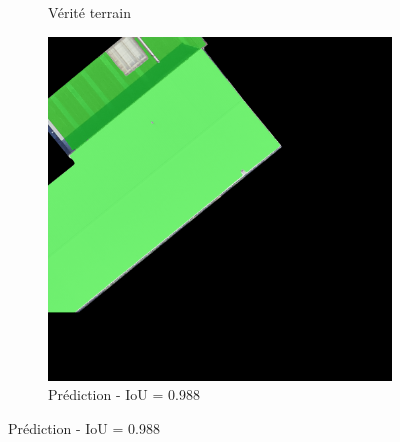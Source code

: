 \begin{figure}[H]
\begin{subfigure}{0.32\textwidth}
    \caption{Vérité terrain}
\end{subfigure}
\hfill
\begin{subfigure}{0.32\textwidth}
    \includegraphics[width=\textwidth]{02-main//figures/ch4/kfold_ensembles/unet_tu-mambaout_small/best_cases/best_3_iou0.988_24931117_tile_18_5_f475a0_overlay_pred.png}
    \caption{Prédiction - IoU = 0.988}
\end{subfigure}

\vspace{0.35cm}


\end{figure}
